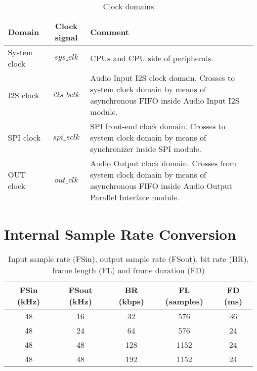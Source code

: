 \documentclass{ug}
\theoremstyle{plain}
\begin{document}
\begin{table}[H]
  \begin{center}
    \begin{tabular}{|l|c|p{10cm}|}
      \hline

      \rowcolor{iob-green}
      \textbf{Domain}  & \textbf{Clock signal} & \textbf{Comment}\\
      \hline
      \hline

      System clock & $sys\_clk$ & CPUs and CPU side of peripherals.\\ \hline

      \rowcolor{iob-blue} I2S clock & $i2s\_bclk$ & Audio Input I2S clock
      domain. Crosses to system clock domain by means of asynchronous FIFO
      inside Audio Input I2S module.\\ \hline

      SPI clock & $spi\_sclk$ & SPI front-end clock domain. Crosses to system
      clock domain by means of synchronizer inside SPI module.\\ \hline

      \rowcolor{iob-blue} OUT clock & $out\_clk$ & Audio Output clock
      domain. Crosses from system clock domain by means of asynchronous FIFO
      inside Audio Output Parallel Interface module.\\ \hline
      
    \end{tabular}
    \caption{Clock domains}
    \label{tab:cdc}
  \end{center}
\end{table}


\section{Internal Sample Rate Conversion}
\label{sec:src}

\begin{table}[H]
  \begin{center}
    \begin{tabular}{|c|c|c|c|c|}
      \hline

      \rowcolor{iob-green}
      \textbf{FSin (kHz)} & \textbf{FSout (kHz)} & \textbf{BR (kbps)}  & \textbf{FL (samples)} & \textbf{FD (ms)}\\
      \hline
      \hline

      48 & 16 & 32 & 576  & 36 \\ \hline

      \rowcolor{iob-blue} 
      48 & 24 & 64  & 576 & 24 \\ \hline

      48 & 48 & 128 & 1152 & 24 \\ \hline

      \rowcolor{iob-blue} 
      48 & 48 & 192 & 1152 & 24 \\\hline

    \end{tabular}
    \caption{Input sample rate (FSin), output sample rate (FSout), bit rate (BR), frame length (FL) and frame duration (FD)}
    \label{tab:src}
  \end{center}
\end{table}
\end{document}
